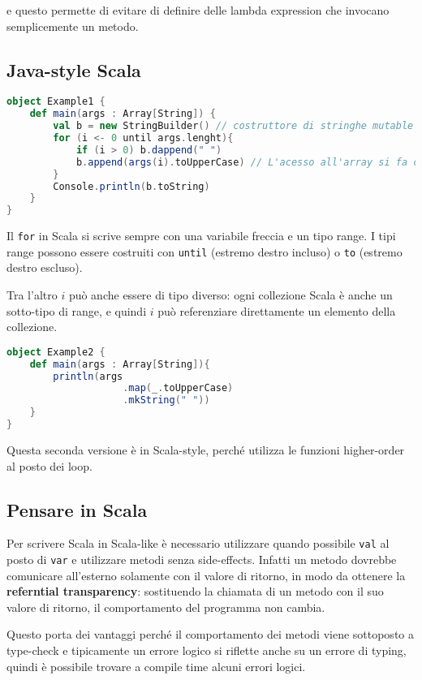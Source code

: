e questo permette di evitare di definire delle lambda expression che invocano semplicemente un metodo.

\subsection{Java-style Scala}

\begin{lstlisting}[language = Scala]
object Example1 {
	def main(args : Array[String]) {
		val b = new StringBuilder() // costruttore di stringhe mutable
		for (i <- 0 until args.lenght){
			if (i > 0) b.dappend(" ")
			b.append(args(i).toUpperCase) // L'acesso all'array si fa con le ( ) e non con le [  ]
		}
		Console.println(b.toString)
	}
}
\end{lstlisting}

Il \texttt{for} in Scala si scrive sempre con una variabile freccia e un tipo range. I tipi range possono essere costruiti con \texttt{until} (estremo destro incluso) o \texttt{to} (estremo destro escluso).

Tra l'altro $i$ può anche essere di tipo diverso: ogni collezione Scala è anche un sotto-tipo di range, e quindi $i$ può referenziare direttamente un elemento della collezione. 

\begin{lstlisting}[language=Scala]
object Example2 {
	def main(args : Array[String]){
		println(args
					.map(_.toUpperCase)
					.mkString(" "))
	}
}
\end{lstlisting}

Questa seconda versione è in Scala-style, perché utilizza le funzioni higher-order al posto dei loop.

\subsection{Pensare in Scala}

Per scrivere Scala in Scala-like è necessario utilizzare quando possibile \texttt{val} al posto di \texttt{var} e utilizzare metodi senza side-effects.
Infatti un metodo dovrebbe comunicare all'esterno solamente con il valore di ritorno, in modo da ottenere la \textbf{referntial transparency}: sostituendo la chiamata di un metodo con il suo valore di ritorno, il comportamento del programma non cambia.

Questo porta dei vantaggi perché il comportamento dei metodi viene sottoposto a type-check e tipicamente un errore logico si riflette anche su un errore di typing, quindi è possibile trovare a compile time alcuni errori logici.

